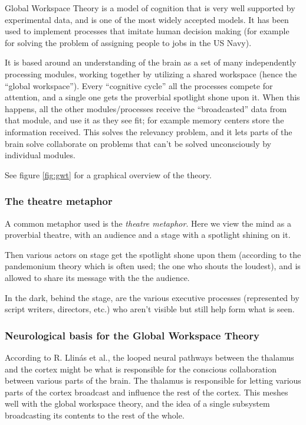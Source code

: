Global Workspace Theory is a model of cognition that is very well supported by experimental data, and is one of the most widely accepted models. \cite{dehaene2001towards} It has been used to implement processes that imitate human decision making (for example for solving the problem of assigning people to jobs in the US Navy).\cite{baars2005gwt}\cite{franklin2003interacting}

It is based around an understanding of the brain as a set of many independently processing modules, working together by utilizing a shared workspace (hence the ``global workspace''). Every ``cognitive cycle'' all the processes compete for attention, and a single one gets the proverbial spotlight shone upon it.\cite{baars2005gwt} When this happens, all the other modules/processes receive the ``broadcasted'' data from that module, and use it as they see fit; for example memory centers store the information received. This solves the relevancy problem, and it lets parts of the brain solve collaborate on problems that can't be solved unconsciously by individual modules.

See figure \ref{fig:gwt} for a graphical overview of the theory.

\subsubsection{The theatre metaphor}
A common metaphor used is the {\em theatre metaphor}. Here we view the mind as a proverbial theatre, with an audience and a stage with a spotlight shining on it.

Then various actors on stage get the spotlight shone upon them (according to the pandemonium theory which is often used; the one who shouts the loudest\cite{selfridge1958pandemonium}), and is allowed to share its message with the the audience.

In the dark, behind the stage, are the various executive processes (represented by script writers, directors, etc.) who aren't visible but still help form what is seen.

\subsubsection{Neurological basis for the Global Workspace Theory}
According to R. Llinás et al.\cite{llinas1998neuronal}, the looped neural pathways between the thalamus and the cortex might be what is responsible for the conscious collaboration between various parts of the brain. The thalamus is responsible for letting various parts of the cortex broadcast and influence the rest of the cortex. This meshes well with the global workspace theory, and the idea of a single subsystem broadcasting its contents to the rest of the whole.

